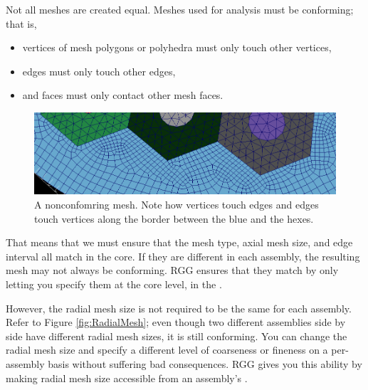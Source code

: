 Not all meshes are created equal.  Meshes used for analysis must be conforming; that is,

\begin{itemize}
	\item{vertices of mesh polygons or polyhedra must only touch other vertices,}
	\item{edges must only touch other edges,}
	\item{and faces must only contact other mesh faces.}
\end{itemize}

\begin{figure}[H]
	\begin{center}
		\includegraphics[width=\linewidth]{Images/nonconforming-mesh.png}
		\caption{A nonconfomring mesh.  Note how vertices touch edges and edges touch vertices along the border between the blue and the hexes.}
		\label{fig:NonconformingMesh}
	\end{center}
\end{figure}

That means that we must ensure that the mesh type, axial mesh size, and edge interval all match in the core.  If they are different in each assembly, the resulting mesh may not always be conforming.  RGG ensures that they match by only letting you specify them at the core level, in the .

However, the radial mesh size is not required to be the same for each assembly.  Refer to Figure \ref{fig:RadialMesh}; even though two different assemblies side by side have different radial mesh sizes, it is still conforming. You can change the radial mesh size and specify a different level of coarseness or fineness on a per-assembly basis without suffering bad consequences.  RGG gives you this ability by making radial mesh size accessible from an assembly's .